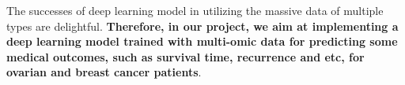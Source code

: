 \documentclass{article}
\begin{document}
The successes of deep learning model in utilizing the massive data of multiple types are delightful. \textbf{Therefore, in our project, we aim at implementing a deep learning model trained with multi-omic data for predicting some medical outcomes, such as survival time, recurrence and etc, for ovarian and breast cancer patients}.




\end{document}
